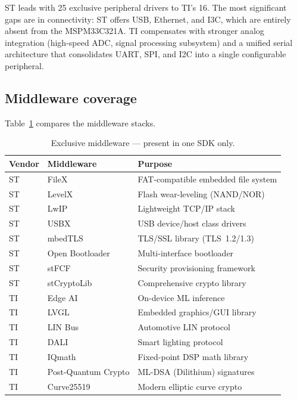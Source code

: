 ST leads with 25 exclusive peripheral drivers to TI's 16. The most significant gaps are
in connectivity: ST offers USB, Ethernet, and I3C, which are entirely absent from the
MSPM33C321A. TI compensates with stronger analog integration (high-speed ADC, signal
processing subsystem) and a unified serial architecture that consolidates UART, SPI, and
I2C into a single configurable peripheral.

\subsection{Middleware coverage}
\label{subsec:ti-mw-gaps}

Table~\ref{tab:ti-mw-exclusive} compares the middleware stacks.

\begin{table}[H]
\centering
\caption{Exclusive middleware --- present in one SDK only.}
\label{tab:ti-mw-exclusive}
\begin{tabular}{l l p{6cm}}
\toprule
\textbf{Vendor} & \textbf{Middleware} & \textbf{Purpose} \\
\midrule
ST & FileX              & FAT-compatible embedded file system \\
ST & LevelX             & Flash wear-leveling (NAND/NOR) \\
ST & LwIP               & Lightweight TCP/IP stack \\
ST & USBX               & USB device/host class drivers \\
ST & mbedTLS             & TLS/SSL library (TLS~1.2/1.3) \\
ST & Open Bootloader     & Multi-interface bootloader \\
ST & stFCF               & Security provisioning framework \\
ST & stCryptoLib          & Comprehensive crypto library \\
\midrule
TI & Edge AI             & On-device ML inference \\
TI & LVGL                & Embedded graphics/GUI library \\
TI & LIN Bus             & Automotive LIN protocol \\
TI & DALI                & Smart lighting protocol \\
TI & IQmath              & Fixed-point DSP math library \\
TI & Post-Quantum Crypto & ML-DSA (Dilithium) signatures \\
TI & Curve25519          & Modern elliptic curve crypto \\
\bottomrule
\end{tabular}
\end{table}

